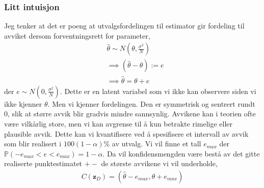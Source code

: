 \subsubsection{Litt intuisjon}
Jeg tenker at det er poeng at utvalgsfordelingen til estimator gir fordeling til avviket dersom forventningsrett for parameter,
\begin{align}
&\hat{\theta}\sim N\left(\theta, \frac{\sigma^2}{N}\right) \\
&\implies (\hat{\theta}-\theta):=e  \\
&\implies \hat{\theta}=\theta + e
\end{align}
der $e \sim N\left(0, \frac{\sigma^2}{N}\right)$. Dette er en latent variabel som vi ikke kan observere siden vi ikke kjenner $\theta$. Men vi kjenner fordelingen. Den er symmetrisk og sentrert rundt $0$, slik at større avvik blir gradvis mindre sannsynlig. Avvikene kan i teorien ofte være vilkårlig store, men vi kan avgrense til å kun betrakte rimelige eller plausible avvik. Dette kan vi kvantifisere ved å spesifisere et intervall av avvik som blir realisert i $100(1-\alpha)\%$ av utvalg. Vi vil finne et tall $e_{max}$ der $\mathbb{P}(-e_{max}<e<e_{max}) = 1-\alpha$. Da vil konfidensmengden være bestå av det gitte realiserte punktestimatet $+-$ de største avvikene vi vil underholde,
\begin{align}
C(\mathbf{z}_D) = (\hat{\theta}-e_{max}, \hat{\theta}+e_{max})
\end{align}
